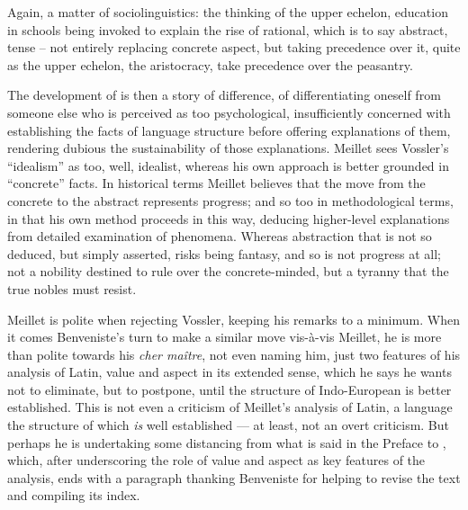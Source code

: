 \documentclass[output=paper]{langscibook}
\begin{document}
Again, a matter of sociolinguistics: the thinking of the upper echelon, education in schools being invoked to explain the rise of rational, which is to say abstract, tense -- not entirely replacing concrete aspect, but taking precedence over it, quite as the upper echelon, the aristocracy, take precedence over the peasantry.

The development of  is then a story of difference, of differentiating oneself from someone else who is perceived as too psychological, insufficiently concerned with establishing the facts of language structure before offering explanations of them, rendering dubious the sustainability of those explanations. Meillet sees Vossler's ``idealism'' as too, well, idealist, whereas his own approach is better grounded in ``concrete'' facts. In historical terms Meillet believes that the move from the concrete to the abstract represents progress; and so too in methodological terms, in that his own method proceeds in this way, deducing higher-level explanations from detailed examination of phenomena. Whereas abstraction that is not so deduced, but simply asserted, risks being fantasy, and so is not progress at all; not a nobility destined to rule over the concrete-minded, but a tyranny that the true nobles must resist.

Meillet is polite when rejecting Vossler, keeping his remarks to a minimum. When it comes Benveniste's turn to make a similar move vis-à-vis Meillet, he is more than polite towards his \emph{cher maître}, not even naming him, just two features of his analysis of Latin, value and aspect in its extended sense, which he says he wants not to eliminate, but to postpone, until the structure of Indo-European is better established. This is not even a criticism of Meillet's analysis of Latin, a language the structure of which \emph{is} well established — at least, not an overt criticism. But perhaps he is undertaking some distancing from what is said in the Preface to \citet{Meillet1931}, which, after underscoring the role of value and aspect as key features of the analysis, ends with a paragraph thanking Benveniste for helping to revise the text and compiling its index.
\end{document}
